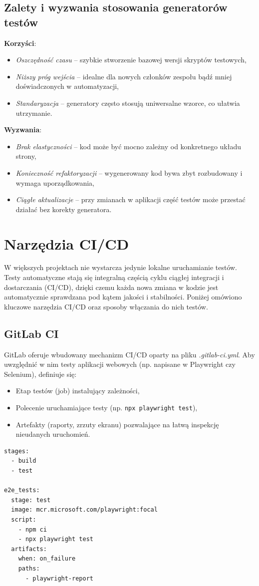 \documentclass[12pt]{report}
\begin{document}
\subsection*{Zalety i wyzwania stosowania generatorów testów}
\textbf{Korzyści}:
\begin{itemize}
    \item \emph{Oszczędność czasu} -- szybkie stworzenie bazowej wersji skryptów testowych,
    \item \emph{Niższy próg wejścia} -- idealne dla nowych członków zespołu bądź mniej doświadczonych w automatyzacji,
    \item \emph{Standaryzacja} -- generatory często stosują uniwersalne wzorce, co ułatwia utrzymanie.
\end{itemize}
\textbf{Wyzwania}:
\begin{itemize}
    \item \emph{Brak elastyczności} -- kod może być mocno zależny od konkretnego układu strony,
    \item \emph{Konieczność refaktoryzacji} -- wygenerowany kod bywa zbyt rozbudowany i wymaga uporządkowania,
    \item \emph{Ciągłe aktualizacje} -- przy zmianach w aplikacji część testów może przestać działać bez korekty generatora.
\end{itemize}

\section{Narzędzia CI/CD}
\label{sec:narzedzia-ci-cd}
W większych projektach nie wystarcza jedynie lokalne uruchamianie testów. Testy automatyczne stają się integralną częścią cyklu ciągłej integracji i dostarczania (CI/CD), dzięki czemu każda nowa zmiana w kodzie jest automatycznie sprawdzana pod kątem jakości i stabilności. Poniżej omówiono kluczowe narzędzia CI/CD oraz sposoby włączania do nich testów.

\subsection*{GitLab CI}
GitLab oferuje wbudowany mechanizm CI/CD oparty na pliku \emph{.gitlab-ci.yml}. Aby uwzględnić w nim testy aplikacji webowych (np. napisane w Playwright czy Selenium), definiuje się:
\begin{itemize}
    \item Etap testów (job) instalujący zależności,
    \item Polecenie uruchamiające testy (np. \texttt{npx playwright test}),
    \item Artefakty (raporty, zrzuty ekranu) pozwalające na łatwą inspekcję nieudanych uruchomień.
\end{itemize}
\begin{verbatim}
stages:
  - build
  - test

e2e_tests:
  stage: test
  image: mcr.microsoft.com/playwright:focal
  script:
    - npm ci
    - npx playwright test
  artifacts:
    when: on_failure
    paths:
      - playwright-report
\end{verbatim}
\end{document}
